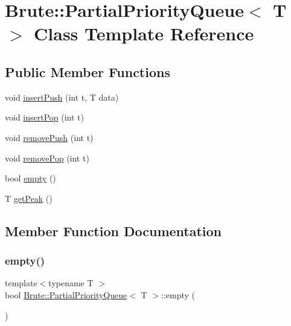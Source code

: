 \hypertarget{classBrute_1_1PartialPriorityQueue}{}\section{Brute\+:\+:Partial\+Priority\+Queue$<$ T $>$ Class Template Reference}
\label{classBrute_1_1PartialPriorityQueue}
\subsection*{Public Member Functions}
\begin{DoxyCompactItemize}
\item 
void \hyperlink{classBrute_1_1PartialPriorityQueue_a67fca61de9266a9df9a59d327e2743d5}{insert\+Push} (int t, T data)
\item 
void \hyperlink{classBrute_1_1PartialPriorityQueue_a2fc548b76d208334f3e237afb6b2eb93}{insert\+Pop} (int t)
\item 
void \hyperlink{classBrute_1_1PartialPriorityQueue_aca1b2c7c9adb51f1d0518ca0e2c79905}{remove\+Push} (int t)
\item 
void \hyperlink{classBrute_1_1PartialPriorityQueue_a74a0cac80a46b861a3869473c9b9def8}{remove\+Pop} (int t)
\item 
bool \hyperlink{classBrute_1_1PartialPriorityQueue_acc88fe46c9844d428e8708ca6e4ce1b9}{empty} ()
\item 
T \hyperlink{classBrute_1_1PartialPriorityQueue_ad1ca11a46c031d68cf3cd61e820c0036}{get\+Peak} ()
\end{DoxyCompactItemize}


\subsection{Member Function Documentation}
\mbox{\label{classBrute_1_1PartialPriorityQueue_acc88fe46c9844d428e8708ca6e4ce1b9}} 
\subsubsection{\texorpdfstring{empty()}{empty()}}
{\footnotesize\ttfamily template$<$typename T $>$ \\
bool \hyperlink{classBrute_1_1PartialPriorityQueue}{Brute\+::\+Partial\+Priority\+Queue}$<$ T $>$\+::empty (\begin{DoxyParamCaption}{ }\end{DoxyParamCaption})}

